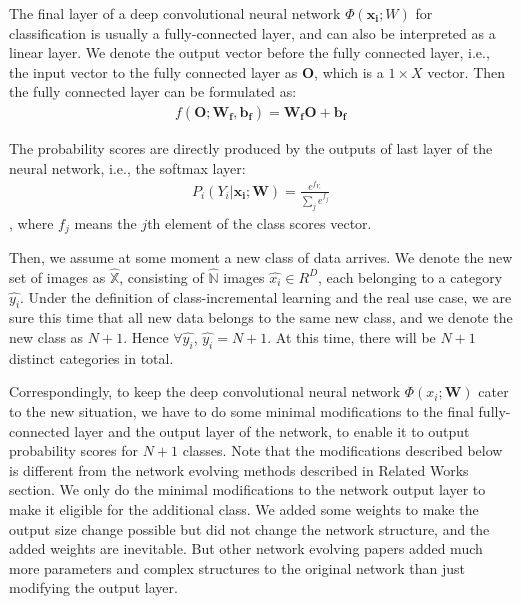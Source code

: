 The final layer of a deep convolutional neural network $\Phi(\mathbf{x_i}; W)$ for classification is usually a fully-connected layer, and can also be interpreted as a linear layer. We denote the output vector before the fully connected layer, i.e., the input vector to the fully connected layer as $\mathbf{O}$, which is a $1 \times X$ vector. Then the fully connected layer can be formulated as:
\begin{align}
f(\mathbf{O}; \mathbf{W_f}, \mathbf{b_f}) =  \mathbf{W_f}\mathbf{O} + \mathbf{b_f}
\end{align}

The probability scores are directly produced by the outputs of last layer of the neural network, i.e., the softmax layer:
\begin{align}
P_i(Y_i|\mathbf{x_i};\mathbf{W}) = \frac{e^{f_{Y_i}}}{\sum_j e^{f_j}}
\end{align}, where $f_j$ means the $j$th element of the class scores vector.

Then, we assume at some moment a new class of data arrives. We denote the new set of images as $\hat{\mathbb{X}}$, consisting of $\hat{\mathbb{N}}$ images $\hat{x_i} \in R^D$, each belonging to a category $\hat{y_i}$. Under the definition of class-incremental learning and the real use case, we are sure this time that all new data belongs to the same new class, and we denote the new class as $N+1$. Hence $\forall \hat{y_i}$, $\hat{y_i}=N+1$. At this time, there will be $N+1$ distinct categories in total. 

Correspondingly, to keep the deep convolutional neural network $\Phi(x_i; \mathbf{W})$ cater to the new situation, we have to do some minimal modifications to the final fully-connected layer and the output layer of the network, to enable it to output probability scores for $N+1$ classes. Note that the modifications described below is different from the network evolving methods described in Related Works section. We only do the minimal modifications to the network output layer to make it eligible for the additional class. We added some weights to make the output size change possible but did not change the network structure, and the added weights are inevitable. But other network evolving papers added much more parameters and complex structures to the original network than just modifying the output layer.

